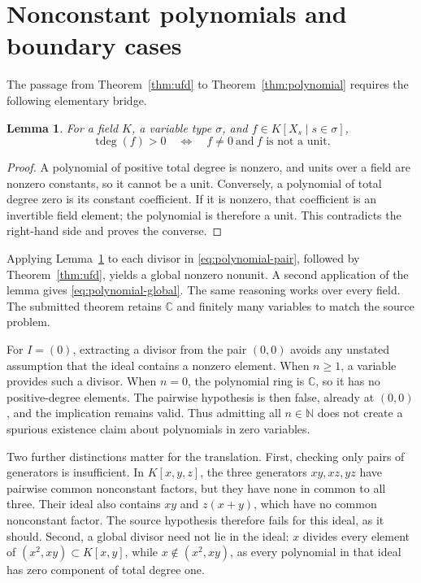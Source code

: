 \documentclass[11pt]{article}
\newtheorem{lemma}[theorem]{Lemma}
\theoremstyle{remark}
\newcommand{\C}{\mathbb{C}}
\newcommand{\N}{\mathbb{N}}
\newcommand{\td}{\operatorname{tdeg}}
\begin{document}
\section{Nonconstant polynomials and boundary cases}

The passage from Theorem~\ref{thm:ufd} to
Theorem~\ref{thm:polynomial} requires the following elementary bridge.

\begin{lemma}\label{lem:degree}
For a field $K$, a variable type $\sigma$, and
$f\in K[X_s\mid s\in\sigma]$,
\[
  \td(f)>0
  \quad\Longleftrightarrow\quad
  f\ne0\ \text{and}\ f\text{ is not a unit}.
\]
\end{lemma}

\begin{proof}
A polynomial of positive total degree is nonzero, and units over a
field are nonzero constants, so it cannot be a unit. Conversely,
a polynomial of total degree zero is its constant coefficient.
If it is nonzero, that coefficient is an invertible field element;
the polynomial is therefore a unit. This contradicts the right-hand
side and proves the converse.
\end{proof}

Applying Lemma~\ref{lem:degree} to each divisor in
\eqref{eq:polynomial-pair}, followed by Theorem~\ref{thm:ufd}, yields
a global nonzero nonunit. A second application of the lemma gives
\eqref{eq:polynomial-global}. The same reasoning works over every
field. The submitted theorem retains $\C$ and finitely many variables
to match the source problem.

For $I=(0)$, extracting a divisor from the pair $(0,0)$ avoids any
unstated assumption that the ideal contains a nonzero element.
When $n\ge1$, a variable provides such a divisor. When $n=0$, the
polynomial ring is $\C$, so it has no positive-degree elements.
The pairwise hypothesis is then false, already at $(0,0)$, and the
implication remains valid. Thus admitting all $n\in\N$ does not create
a spurious existence claim about polynomials in zero variables.

Two further distinctions matter for the translation. First, checking
only pairs of generators is insufficient. In $K[x,y,z]$, the three
generators $xy,xz,yz$ have pairwise common nonconstant factors, but
they have none in common to all three. Their ideal also contains
$xy$ and $z(x+y)$, which have no common nonconstant factor. The source
hypothesis therefore fails for this ideal, as it should. Second, a
global divisor need not lie in the ideal: $x$ divides every element
of $(x^2,xy)\subset K[x,y]$, while $x\notin(x^2,xy)$, as every
polynomial in that ideal has zero component of total degree one.
\end{document}
